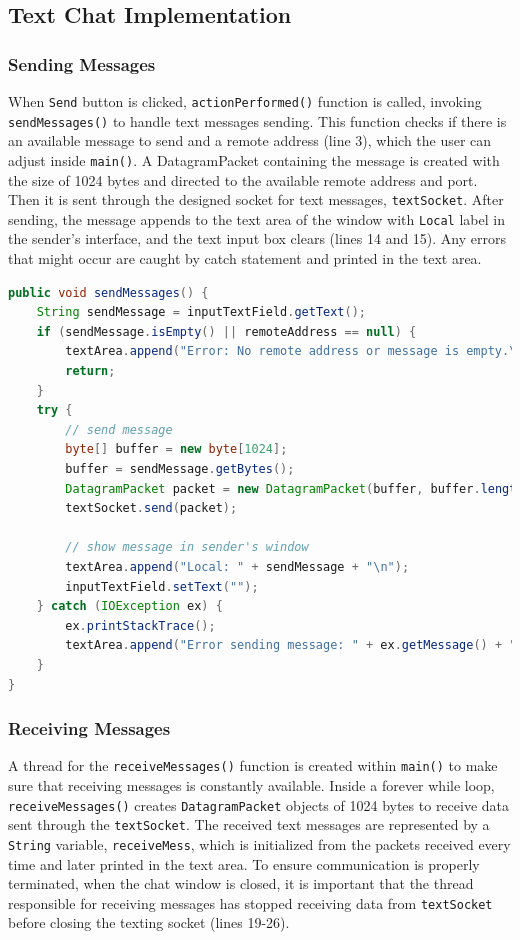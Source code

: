 \documentclass{article}
\begin{document}
\subsection{Text Chat Implementation}
\subsubsection{Sending Messages}
When \texttt{Send} button is clicked, \texttt{actionPerformed()} function is called, invoking \texttt{sendMessages()} to handle text messages sending. This function checks if there is an available message to send and a remote address (line 3), which the user can adjust inside \texttt{main()}. A DatagramPacket containing the message is created with the size of 1024 bytes and directed to the available remote address and port. Then it is sent through the designed socket for text messages, \texttt{textSocket}. After sending, the message appends to the text area of the window with \texttt{Local} label in the sender's interface, and the text input box clears (lines 14 and 15). Any errors that might occur are caught by catch statement and printed in the text area.
\newline

\begin{lstlisting}[language=Java, caption={Sending messages function}]
public void sendMessages() {
	String sendMessage = inputTextField.getText();
	if (sendMessage.isEmpty() || remoteAddress == null) {
		textArea.append("Error: No remote address or message is empty.\n");
		return;
	}
	try {
		// send message
		byte[] buffer = new byte[1024];
        buffer = sendMessage.getBytes();
		DatagramPacket packet = new DatagramPacket(buffer, buffer.length, remoteAddress, textRemotePort);
		textSocket.send(packet);

		// show message in sender's window
		textArea.append("Local: " + sendMessage + "\n");
		inputTextField.setText("");
	} catch (IOException ex) {
		ex.printStackTrace();
		textArea.append("Error sending message: " + ex.getMessage() + "\n");
    }
}
\end{lstlisting}

\subsubsection{Receiving Messages}
A thread for the \texttt{receiveMessages()} function is created within \texttt{main()} to make sure that receiving messages is constantly available. Inside a forever while loop, \texttt{receiveMessages()} creates \texttt{DatagramPacket} objects of 1024 bytes to receive data sent through the \texttt{textSocket}. The received text messages are represented by a \texttt{String} variable, \texttt{receiveMess}, which is initialized from the packets received every time and later printed in the text area. To ensure communication is properly terminated, when the chat window is closed, it is important that the thread responsible for receiving messages has stopped receiving data from \texttt{textSocket} before closing the texting socket (lines 19-26).
\end{document}
